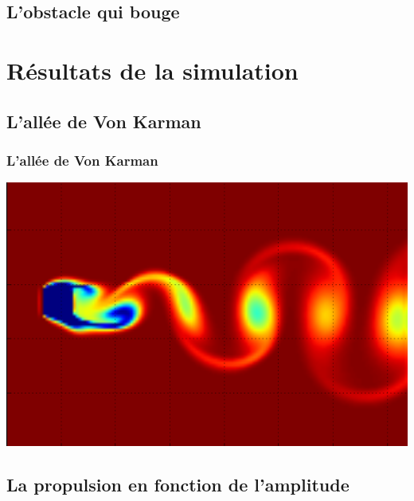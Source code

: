 \documentclass{beamer}
\begin{document}
  \subsection{L'obstacle qui bouge}
  
\section{Résultats de la simulation}

 \subsection{L'allée de Von Karman}
 	\begin{frame}
 		\frametitle{L'allée de Von Karman}
 		\centering \includegraphics[height= 0.7 \textheight]{VK_pas_mal.png}	
 	\end{frame}
 
 \subsection{La propulsion en fonction de l'amplitude}
 		
\end{document}
